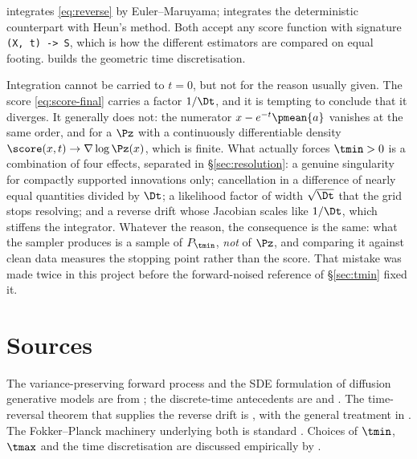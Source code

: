 \begin{codebox}
 integrates \eqref{eq:reverse} by Euler--Maruyama;
 integrates the deterministic counterpart
with Heun's method. Both accept any score function with signature \texttt{(X, t) -> S}, which
is how the different estimators are compared on equal footing.
 builds the geometric time discretisation.
\end{codebox}

\begin{pitfall}
Integration cannot be carried to $t=0$, but not for the reason usually given. The score
\eqref{eq:score-final} carries a factor $1/\Dt$, and it is tempting to conclude that it
diverges. It generally does not: the numerator $x - e^{-t}\pmean{a}$ vanishes at the same
order, and for a $\Pz$ with a continuously differentiable density
$\score(x,t)\to\nabla\log\Pz(x)$, which is finite. What actually forces $\tmin>0$ is a
combination of four effects, separated in \S\ref{sec:resolution}: a genuine singularity for
compactly supported innovations only; cancellation in a difference of nearly equal
quantities divided by $\Dt$; a likelihood factor of width $\sqrt{\Dt}$ that the grid stops
resolving; and a reverse drift whose Jacobian scales like $1/\Dt$, which stiffens the
integrator. Whatever the reason, the consequence is the same: what the sampler produces is a
sample of $P_{\tmin}$, \emph{not} of $\Pz$, and comparing it against clean data measures the
stopping point rather than the score. That mistake was made twice in this project before the
forward-noised reference of \S\ref{sec:tmin} fixed it.
\end{pitfall}

\section*{Sources}
The variance-preserving forward process and the SDE formulation of diffusion generative models
are from \citet{song2021}; the discrete-time antecedents are \citet{sohl2015} and
\citet{ho2020}. The time-reversal theorem that supplies the reverse drift is
\citet{anderson1982}, with the general treatment in \citet{haussmann1986}. The Fokker--Planck
machinery underlying both is standard \citep{risken1989}. Choices of $\tmin$, $\tmax$ and the
time discretisation are discussed empirically by \citet{karras2022}.
